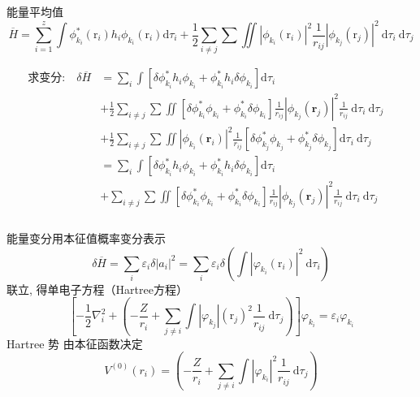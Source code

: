\begin{frame}[label=current]
  \frametitle{}
能量平均值
$$
\overline{H}=\sum_{i=1}^z \int \phi_{k_i}^*\left(\mathrm{r}_i\right) h_i \phi_{k_i}\left(\mathrm{r}_i\right) \mathrm{d} \tau_i+\frac{1}{2} \sum_{i \neq j} \sum \iint\left|\phi_{k_i}\left(\mathrm{r}_i\right)\right|^2 \frac{1}{r_{i j}}\left|\phi_{k_j}\left(\mathrm{r}_j\right)\right|^2 \mathrm{~d} \tau_i \mathrm{~d} \tau_j
$$
 
$$ 
\begin{aligned}
  \text{求变分:} \quad \delta \overline{H} & =\sum_i \int\left[\delta \phi_{k_i}^* h_i \phi_{k_i}+\phi_{k_i}^* h_i \delta \phi_{k_i}\right] \mathrm{d} \tau_i \\
& +\frac{1}{2} \sum_{i \neq j} \sum \iint\left[\delta \phi_{k_i}^* \phi_{k_i}+\phi_{k_i}^* \delta \phi_{k_i}\right] \frac{1}{r_{i j}}\left|\phi_{k_j}\left(\boldsymbol{r}_j\right)\right|^2 \frac{1}{r_{i j}} \mathrm{~d} \tau_i \mathrm{~d} \tau_j \\
& +\frac{1}{2} \sum_{i \neq j} \sum \iint\left|\phi_{k_i}\left(\boldsymbol{r}_i\right)\right|^2 \frac{1}{r_{i j}}\left[\delta \phi_{k_j}^* \phi_{k_j}+\phi_{k_j}^* \delta \phi_{k_j}\right] \mathrm{d} \tau_i \mathrm{~d} \tau_j \qquad  \\
& =\sum_i \int\left[\delta \phi_{k_i}^* h_i \phi_{k_i}+\phi_{k_i}^* h_i \delta \phi_{k_i}\right] \mathrm{d} \tau_i \\
& +\sum_{i \neq j} \sum \iint\left[\delta \phi_{k_i}^* \phi_{k_i}+\phi_{k_i}^* \delta \phi_{k_i}\right] \frac{1}{r_{i j}}\left|\phi_{k_j}\left(\boldsymbol{r}_j\right)\right|^2 \frac{1}{r_{i j}} \mathrm{~d} \tau_i \mathrm{~d} \tau_j
\end{aligned}
$$
\end{frame} 

\begin{frame}[label=current]
  \frametitle{}
能量变分用本征值概率变分表示
$$
\delta \overline{H} =\sum_i \varepsilon_i \delta\left|a_i\right|^2=\sum_i \varepsilon_i \delta\left(\int\left|\varphi_{k_i}\left(\mathrm{r}_i\right)\right|^2 \mathrm{~d} \tau_i\right)
$$
联立, 得单电子方程（Hartree方程）
$$
\left[-\frac{1}{2} \nabla_i^2+\left(-\frac{Z}{r_i}+\sum_{j \neq i} \int\left|\varphi_{k_j}\right|\left(\mathrm{r}_j\right)^2 \frac{1}{r_{i j}} \mathrm{~d} \tau_j\right)\right] \varphi_{k_i}=\varepsilon_i \varphi_{k_i}
$$
Hartree 势 由本征函数决定
$$
V^{(0)}\left(r_i\right)=\left(-\frac{Z}{r_i}+\sum_{j \neq i} \int\left|\varphi_{k_i}\right|^2 \frac{1}{r_{i j}} \mathrm{~d} \tau_j \right)
$$
\end{frame} 


